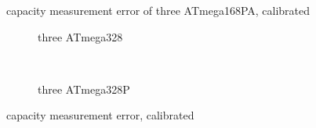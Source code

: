 \begin{figure}[H]
\centering

\caption{capacity measurement error of three ATmega168PA, calibrated}
\label{fig:mega168PAcal}
\end{figure}

\begin{figure}[H]
  \begin{subfigure}[b]{9cm}
    \centering
    \resizebox{9cm}{!}{}
    \caption{three ATmega328}
    \label{fig:mega328cal}
  \end{subfigure}
  ~
  \begin{subfigure}[b]{9cm}
    \centering
    \resizebox{9cm}{!}{}
    \caption{three ATmega328P}
    \label{fig:mega328Pcal}
  \end{subfigure}
  \caption{capacity measurement error, calibrated}
\end{figure}

